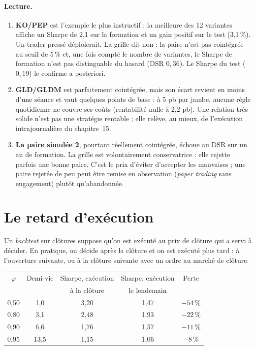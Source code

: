 \paragraph{Lecture.}
\begin{enumerate}
\item \textbf{KO/PEP} est l'exemple le plus instructif : la meilleure des 12 variantes affiche un Sharpe de 2,1 sur la formation et un gain positif sur le test (3,1\,\%). Un trader pressé déploierait. La grille dit non : la paire n'est pas cointégrée au seuil de 5\,\% et, une fois compté le nombre de variantes, le Sharpe de formation n'est pas distinguable du hasard (DSR $0{,}36$). Le Sharpe du test ($0{,}19$) le confirme a posteriori.
\item \textbf{GLD/GLDM} est parfaitement cointégrée, mais son écart revient en moins d'une séance et vaut quelques points de base : à 5 pb par jambe, aucune règle quotidienne ne couvre ses coûts (rentabilité nulle à 2,2 pb). Une relation très solide n'est pas une stratégie rentable ; elle relève, au mieux, de l'exécution intrajournalière du chapitre~15.
\item \textbf{La paire simulée 2}, pourtant réellement cointégrée, échoue au DSR sur un an de formation. La grille est volontairement conservatrice : elle rejette parfois une bonne paire. C'est le prix d'éviter d'accepter les mauvaises ; une paire rejetée de peu peut être remise en observation (\emph{paper trading} sans engagement) plutôt qu'abandonnée.
\end{enumerate}

\section{Le retard d'exécution}

Un \emph{backtest} sur clôtures suppose qu'on est exécuté au prix de clôture qui a servi à décider. En pratique, on décide après la clôture et on est exécuté plus tard : à l'ouverture suivante, ou à la clôture suivante avec un ordre au marché de clôture.

\begin{codebox}
\begin{center}\small
\begin{tabular}{ccccc}
\toprule
$\varphi$ & Demi-vie & Sharpe, exécution & Sharpe, exécution & Perte \\
 & & à la clôture & le lendemain & \\
\midrule
0,50 & 1,0 & 3,20 & 1,47 & $-54\,\%$ \\
0,80 & 3,1 & 2,48 & 1,93 & $-22\,\%$ \\
0,90 & 6,6 & 1,76 & 1,57 & $-11\,\%$ \\
0,95 & 13,5 & 1,15 & 1,06 & $-8\,\%$ \\
\bottomrule
\end{tabular}
\end{center}
\end{codebox}


